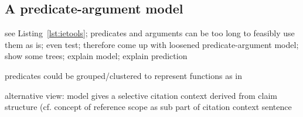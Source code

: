 \subsection{A predicate-argument model}
see Listing~\ref{lst:ietools}; predicates and arguments can be too long to feasibly use them as is; even test; therefore come up with loosened predicate-argument model; show some trees; explain model; explain prediction

predicates could be grouped/clustered to represent functions as in \cite{Gabor2018}

alternative view: model gives a selective citation context derived from claim structure (cf. concept of reference scope as sub part of citation context sentence\cite{Abujbara2012,RAHUL2017}
